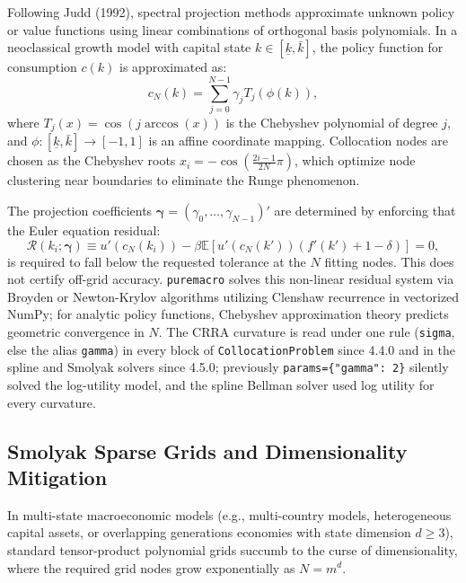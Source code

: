 \documentclass[11pt,letterpaper]{article}
\renewcommand{\_}{\pmunderscore\allowbreak}
\begin{document}
Following Judd (1992), spectral projection methods approximate unknown policy or value functions using linear combinations of orthogonal basis polynomials. In a neoclassical growth model with capital state \(k \in [\underline{k}, \bar{k}]\), the policy function for consumption \(c(k)\) is approximated as:
\[c_N(k) = \sum_{j=0}^{N-1} \gamma_j T_j(\phi(k)),\]
where \(T_j(x) = \cos(j \arccos(x))\) is the Chebyshev polynomial of degree \(j\), and \(\phi: [\underline{k}, \bar{k}] \to [-1, 1]\) is an affine coordinate mapping. Collocation nodes are chosen as the Chebyshev roots \(x_i = -\cos\left(\frac{2i - 1}{2N} \pi\right)\), which optimize node clustering near boundaries to eliminate the Runge phenomenon.

The projection coefficients \(\bm{\gamma} = (\gamma_0, \dots, \gamma_{N-1})'\) are determined by enforcing that the Euler equation residual:
\[\mathcal{R}(k_i; \bm{\gamma}) \equiv u'(c_N(k_i)) - \beta \mathbb{E}\left[ u'(c_N(k')) (f'(k') + 1 - \delta) \right] = 0,\]
is required to fall below the requested tolerance at the \(N\) fitting nodes. This does not certify off-grid accuracy. \texttt{puremacro} solves this non-linear residual system via Broyden or Newton-Krylov algorithms utilizing Clenshaw recurrence in vectorized NumPy; for analytic policy functions, Chebyshev approximation theory predicts geometric convergence in \(N\). The CRRA curvature is read under one rule (\texttt{sigma}, else the alias \texttt{gamma}) in every block of \texttt{CollocationProblem} since 4.4.0 and in the spline and Smolyak solvers since 4.5.0; previously \texttt{params=\{"gamma":\ 2\}} silently solved the log-utility model, and the spline Bellman solver used log utility for every curvature.

\subsection{Smolyak Sparse Grids and Dimensionality Mitigation}\label{smolyak-sparse-grids-and-dimensionality-mitigation}

In multi-state macroeconomic models (e.g., multi-country models, heterogeneous capital assets, or overlapping generations economies with state dimension \(d \ge 3\)), standard tensor-product polynomial grids succumb to the curse of dimensionality, where the required grid nodes grow exponentially as \(N = m^d\).
\end{document}
